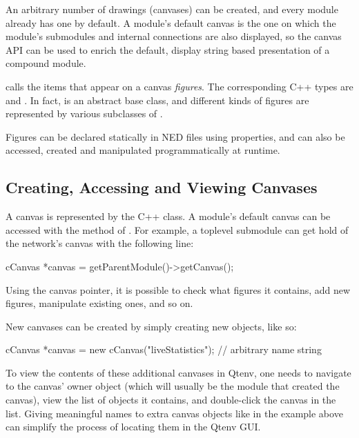 An arbitrary number of drawings (canvases) can be created, and every module
already has one by default. A module's default canvas is the one on which
the module's submodules and internal connections are also displayed, so the
canvas API can be used to enrich the default, display string based
presentation of a compound module.

{\opp} calls the items that appear on a canvas \textit{figures}. The
corresponding C++ types are  and . In fact,
 is an abstract base class, and different kinds of figures
are represented by various subclasses of .

Figures can be declared statically in NED files using 
properties, and can also be accessed, created and manipulated
programmatically at runtime.


\subsection{Creating, Accessing and Viewing Canvases}
\label{sec:graphics:creating-accessing-and-viewing-canvases}

A canvas is represented by the  C++ class. A module's
default canvas can be accessed with the  method of
. For example, a toplevel submodule can get hold of the
network's canvas with the following line:

\begin{cpp}
cCanvas *canvas = getParentModule()->getCanvas();
\end{cpp}

Using the canvas pointer, it is possible to check what figures it
contains, add new figures, manipulate existing ones, and so on.

New canvases can be created by simply creating new 
objects, like so:

\begin{cpp}
cCanvas *canvas = new cCanvas("liveStatistics"); // arbitrary name string
\end{cpp}

To view the contents of these additional canvases in Qtenv, one
needs to navigate to the canvas' owner object (which will usually be the
module that created the canvas), view the list of objects it contains, and
double-click the canvas in the list. Giving meaningful names to extra
canvas objects like in the example above can simplify the process of
locating them in the Qtenv GUI.


